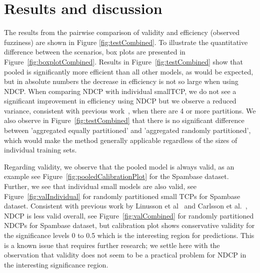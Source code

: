 \documentclass[preprint,12pt,authoryear]{elsarticle}
\begin{document}
\newpage
\section{Results and discussion}\label{sec:results}
The results from the pairwise comparison of validity and efficiency (observed fuzziness) are shown in Figure \ref{fig:testCombined}. To illustrate the quantitative difference between the scenarios, box plots are presented in Figure~\ref{fig:boxplotCombined}.
%
Results in Figure~\ref{fig:testCombined} show that pooled is significantly more efficient than all other models, as would be expected, but in absolute numbers the decrease in efficiency is not so large when using NDCP. When comparing NDCP with individual smallTCP, we do not see a significant improvement in efficiency using NDCP but we observe a reduced variance, consistent with previous work~\citep{Carlsson:2014qr}, when there are 4 or more partitions. We also observe in Figure~\ref{fig:testCombined} that there is no significant difference between 'aggregated equally partitioned' and 'aggregated randomly partitioned', which would make the method generally applicable regardless of the sizes of individual training sets.


Regarding validity, we observe that the pooled model is always valid, as an example see Figure~\ref{fig:pooledCalibrationPlot} for the Spambase dataset. Further, we see that individual small models are also valid, see Figure~\ref{fig:valIndividual} for randomly partitioned small TCPs for Spambase dataset. Consistent with previous work by Linusson et al~\cite{Linusson:2017dn} and Carlsson et al.~\cite{Carlsson:2014qr}, NDCP is less valid overall, see Figure~\ref{fig:valCombined} for randomly partitioned NDCPs for Spambase dataset, but calibration plot shows conservative validity for the significance levels 0 to 0.5 which is the interesting region for predictions. This is a known issue that requires further research; we settle here with the observation that validity does not seem to be a practical problem for NDCP in the interesting significance region.

%
%
\end{document}
